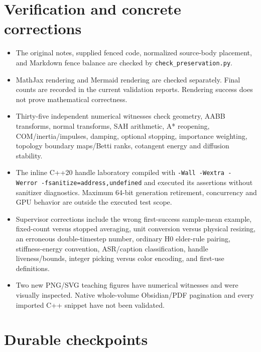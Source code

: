 \section{Verification and concrete corrections}\label{appendix-3b67654799a2-verification-and-concrete-corrections}

\begin{itemize}
\tightlist
\item
  The original notes, supplied fenced code, normalized source-body placement, and Markdown fence balance are checked by \texttt{check\_preservation.py}.
\item
  MathJax rendering and Mermaid rendering are checked separately. Final counts are recorded in the current validation reports. Rendering success does not prove mathematical correctness.
\item
  Thirty-five independent numerical witnesses check geometry, AABB transforms, normal transforms, SAH arithmetic, A* reopening, COM/inertia/impulses, damping, optional stopping, importance weighting, topology boundary maps/Betti ranks, cotangent energy and diffusion stability.
\item
  The inline C++20 handle laboratory compiled with \texttt{-Wall\ -Wextra\ -Werror\ -fsanitize=address,undefined} and executed its assertions without sanitizer diagnostics. Maximum 64-bit generation retirement, concurrency and GPU behavior are outside the executed test scope.
\item
  Supervisor corrections include the wrong first-success sample-mean example, fixed-count versus stopped averaging, unit conversion versus physical resizing, an erroneous double-timestep number, ordinary H0 elder-rule pairing, stiffness-energy convention, ASR/caption classification, handle liveness/bounds, integer picking versus color encoding, and first-use definitions.
\item
  Two new PNG/SVG teaching figures have numerical witnesses and were visually inspected. Native whole-volume Obsidian/PDF pagination and every imported C++ snippet have not been validated.
\end{itemize}

\section{Durable checkpoints}\label{appendix-3b67654799a2-durable-checkpoints}

